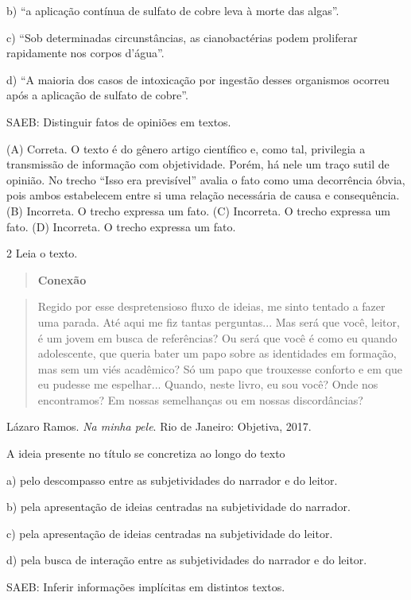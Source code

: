 b) ``a aplicação contínua de sulfato de cobre leva à morte das algas''.

c) ``Sob determinadas circunstâncias, as cianobactérias podem proliferar
rapidamente nos corpos d'água''.

d) ``A maioria dos casos de intoxicação por ingestão desses organismos
ocorreu após a aplicação de sulfato de cobre''.

SAEB: Distinguir fatos de opiniões em textos.

(A) Correta. O texto é do gênero artigo científico e, como tal,
privilegia a transmissão de informação com objetividade. Porém, há nele
um traço sutil de opinião. No trecho ``Isso era previsível'' avalia o
fato como uma decorrência óbvia, pois ambos estabelecem entre si uma
relação necessária de causa e consequência. (B) Incorreta. O trecho
expressa um fato. (C) Incorreta. O trecho expressa um fato. (D)
Incorreta. O trecho expressa um fato.

\num{2} Leia o texto.

\begin{quote}
\textbf{Conexão}
\end{quote}

\begin{quote}
Regido por esse despretensioso fluxo de ideias, me sinto tentado a fazer
uma parada. Até aqui me fiz tantas perguntas... Mas será que você,
leitor, é um jovem em busca de referências? Ou será que você é como eu
quando adolescente, que queria bater um papo sobre as identidades em
formação, mas sem um viés acadêmico? Só um papo que trouxesse conforto e
em que eu pudesse me espelhar... Quando, neste livro, eu sou você? Onde
nos encontramos? Em nossas semelhanças ou em nossas discordâncias?
\end{quote}

Lázaro Ramos. \emph{Na minha pele}. Rio de Janeiro: Objetiva, 2017.

A ideia presente no título se concretiza ao longo do texto

a) pelo descompasso entre as subjetividades do narrador e do leitor.

b) pela apresentação de ideias centradas na subjetividade do narrador.

c) pela apresentação de ideias centradas na subjetividade do leitor.

d) pela busca de interação entre as subjetividades do narrador e do
leitor.

SAEB: Inferir informações implícitas em distintos textos.

